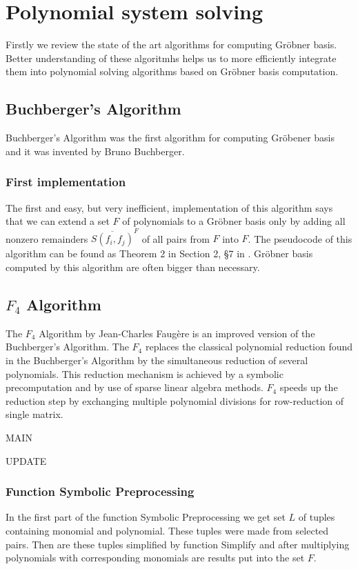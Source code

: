 \chapter{Polynomial system solving}
Firstly we review the state of the art algorithms for computing Gr\"obner basis. Better understanding of these algoritmhs helps us to more efficiently integrate them into polynomial solving algorithms based on Gr\"obner basis computation.

\section{Buchberger's Algorithm}
Buchberger's Algorithm was the first algorithm for computing Gr\"obener basis and it was invented by Bruno Buchberger.

\subsection{First implementation}
The first and easy, but very inefficient, implementation of this algorithm says that we can extend a set $F$ of polynomials to a Gr\"obner basis only by adding all nonzero remainders $\overline{S(f_i, f_j)}^F$ of all pairs from $F$ into $F$.  The pseudocode of this algorithm can be found as Theorem 2 in Section 2, \S 7 in \cite{Cox-Little-Shea97}. Gr\"obner basis computed by this algorithm are often bigger than necessary.

\section{$F_4$ Algorithm}
The $F_4$ Algorithm \cite{F4} by Jean-Charles Faug\`ere is an improved version of the Buchberger's Algorithm. The $F_4$ replaces the classical polynomial reduction found in the Buchberger's Algorithm by the simultaneous reduction of several polynomials. This reduction mechanism is achieved by a symbolic precomputation and by use of sparse linear algebra methods. $F_4$  speeds up the reduction step by exchanging multiple polynomial divisions for row-reduction of single matrix.

MAIN

UPDATE

\subsection{Function Symbolic Preprocessing}
In the first part of the function Symbolic Preprocessing we get set $L$ of tuples containing monomial and polynomial. These tuples were made from selected pairs. Then are these tuples simplified by function Simplify and after multiplying polynomials with corresponding monomials are results put into the set $F$.

